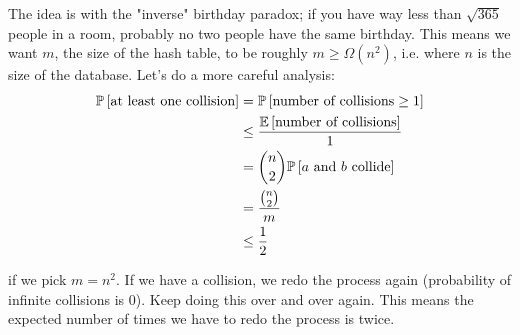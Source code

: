 The idea is with the "inverse" birthday paradox; if you have way less than $\sqrt{365}$ people in a room, probably no two people have the same birthday.
This means we want $m$, the size of the hash table, to be roughly $m \geq \Omega(n^2)$, i.e. where $n$ is the size of the database.
Let's do a more careful analysis:
\begin{align*}
    \mathbb{P}\left[ \text{at least one collision} \right] &= \mathbb{P}\left[ \text{number of collisions} \geq 1 \right] \\
    &\leq \frac{\mathbb{E}\left[ \text{number of collisions} \right]}{1} \\
    &= \binom{n}{2} \mathbb{P}\left[ \text{$a$ and $b$ collide} \right] \\
    &= \frac{\binom{n}{2}}{m} \\
    &\leq \frac{1}{2}
\end{align*}

if we pick $m = n^2$. If we have a collision, we redo the process again (probability of infinite collisions is 0). Keep doing this over and over again.
This means the expected number of times we have to redo the process is twice.